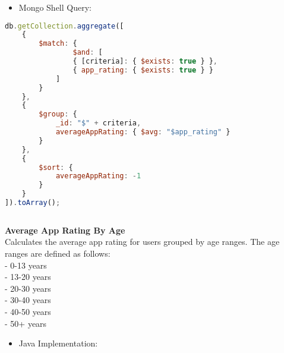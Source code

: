     \begin{itemize}
        \item Mongo Shell Query:
    \end{itemize}
    \begin{lstlisting}[language=JavaScript]
db.getCollection.aggregate([
    { 
        $match: { 
                $and: [
                { [criteria]: { $exists: true } },
                { app_rating: { $exists: true } }
            ]
        } 
    },
    { 
        $group: { 
            _id: "$" + criteria, 
            averageAppRating: { $avg: "$app_rating" }
        } 
    },
    { 
        $sort: { 
            averageAppRating: -1 
        } 
    }
]).toArray();      
        
\end{lstlisting}
\textbf{Average App Rating By Age}\\
Calculates the average app rating for users grouped by age ranges.
The age ranges are defined as follows:\\
- 0-13 years\\
- 13-20 years\\
- 20-30 years\\
- 30-40 years\\
- 40-50 years\\
- 50+ years
\begin{itemize}
    \item Java Implementation:
\end{itemize}
